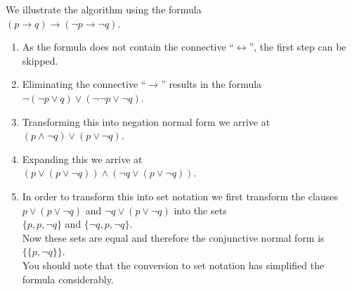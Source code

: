 We illustrate the algorithm using the formula \\[0.2cm]
\hspace*{1.3cm} $(p \rightarrow q) \rightarrow (\neg p \rightarrow \neg q)$.
\begin{enumerate}
\item As the formula does not contain the connective ``$\leftrightarrow$'',
      the first step can be skipped.
\item Eliminating the connective ``$\rightarrow$'' results in the formula \\[0.2cm]
      \hspace*{1.3cm} $\neg (\neg p \vee q) \vee (\neg \neg p \vee \neg q)$.
\item Transforming this into negation normal form we arrive at
      \\[0.2cm]
      \hspace*{1.3cm} $(p \wedge \neg q) \vee (p \vee \neg q)$.
\item Expanding this we arrive at \\[0.2cm]
      \hspace*{1.3cm} $(p \vee (p \vee \neg q)) \wedge (\neg q \vee (p \vee \neg q))$.
\item In order to transform this into set notation we first transform the clauses 
       $p \vee (p \vee \neg q)$ and $\neg q \vee (p \vee \neg q)$ into the sets
      \\[0.2cm]
      \hspace*{1.3cm} $\{p, p, \neg q\}$ \quad and \quad $\{\neg q,  p,  \neg q\}$. \\[0.2cm]
      Now these sets are equal and therefore the conjunctive normal form is
      \\[0.2cm]
      \hspace*{1.3cm} $\bigl\{ \{p, \neg q\} \bigr\}$. \\[0.2cm]
      You should note that the conversion to set notation has simplified the 
      formula considerably.
\end{enumerate}

